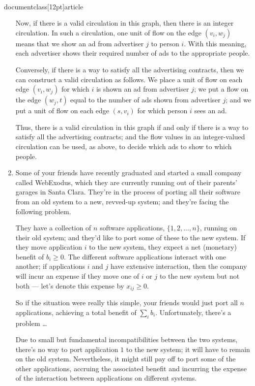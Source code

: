 \\documentclass[12pt]{article}
\begin{document}
\begin{enumerate}
{Now, if there is a valid circulation in this graph, then
there is an integer circulation.
In such a circulation, one unit of flow on the edge
$(v_i, w_j)$ means that we show an ad from advertiser $j$ to person $i$.
With this meaning, each advertiser shows their required
number of ads to the appropriate people.

Conversely, if there is a way to satisfy all the advertising
contracts, then we can construct a valid circulation as follows.
We place a unit of flow on each edge $(v_i, w_j)$
for which $i$ is shown an ad from advertiser $j$;
we put a flow on the edge $(w_j, t)$ equal to 
the number of ads shown from advertiser $j$;
and we put a unit of flow on each edge $(s,v_i)$
for which person $i$ sees an ad.

Thus, there is a valid circulation in this graph if
and only if there is a way to satisfy all the advertising
contracts; and the flow values in an integer-valued
circulation can be used, as above, to decide which
ads to show to which people.

}



\item 

Some of your friends have recently graduated
and started a small company called WebExodus, which they
are currently running out of their parents' garages in Santa Clara.
They're in the process of porting all
their software from an old system to a new, revved-up system;
and they're facing the following problem.

They have a collection of $n$ software applications,
$\{1, 2, \ldots, n\}$, running on their old system;
and they'd like to port some of these to the new system.
If they move application $i$ to the new system, they expect a
net (monetary) benefit of $b_i \geq 0$.
The different software applications interact with one another;
if applications
$i$ and $j$ have extensive interaction, then the company will incur
an expense if they move one of $i$ or $j$ to the new system but not both ---
let's denote this expense by $x_{ij} \geq 0$.

So if the situation were really this simple, your friends would
just port all $n$ applications,
achieving a total benefit of $\sum_i b_i$.
Unfortunately, there's a problem \ldots\

Due to small but fundamental incompatibilities between the two systems,
there's no way to port application $1$ to the new system;
it will have to remain on the old system.
Nevertheless, it might still pay off to port some of the
other applications, accruing the associated benefit and
incurring the expense of the interaction between applications
on different systems.


\end{enumerate}
\end{document}
